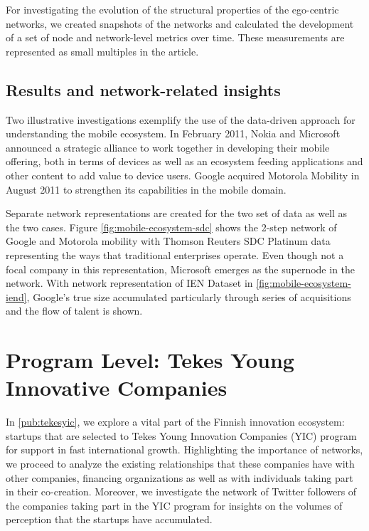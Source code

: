 For investigating the evolution of the structural properties of the ego-centric networks, we created snapshots of the networks and calculated the development of a set of node and network-level metrics over time. These measurements are represented as small multiples in the article.

\subsection{Results and network-related insights}

Two illustrative investigations exemplify the use of the data-driven approach for understanding the mobile ecosystem. In February 2011, Nokia and Microsoft announced a strategic alliance to work together in developing their mobile offering, both in terms of devices as well as an ecosystem feeding applications and other content to add value to device users. Google acquired Motorola Mobility in August 2011 to strengthen its capabilities in the mobile domain.

Separate network representations are created for the two set of data as well as the two cases. Figure \ref{fig:mobile-ecosystem-sdc} shows the 2-step network of Google and Motorola mobility with Thomson Reuters SDC Platinum data representing the ways that traditional enterprises operate. Even though not a focal company in this representation, Microsoft emerges as the supernode in the network. With network representation of IEN Dataset in \ref{fig:mobile-ecosystem-iend}, Google's true size accumulated particularly through series of acquisitions and the flow of talent is shown. 

\section{Program Level: Tekes Young Innovative Companies}

In \ref{pub:tekesyic}, we \citep{Huhtamaki2012NetworksFinland} explore a vital part of the Finnish innovation ecosystem: startups that are selected to Tekes Young Innovation Companies (YIC) program  for support in fast international growth. Highlighting the importance of networks, we proceed to analyze the existing relationships that these companies have with other companies, financing organizations as well as with individuals taking part in their co-creation. Moreover, we investigate the network of Twitter followers of the companies taking part in the YIC program for insights on the volumes of perception that the startups have accumulated.


